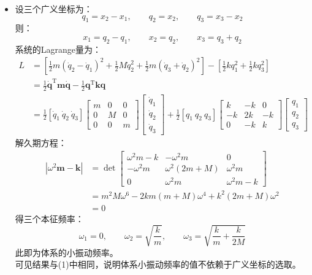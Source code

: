 \documentclass[a4paper,fontset=windows]{ctexart}
\begin{document}
\begin{itemize}
        \item[3.4.(2)]
        设三个广义坐标为：
        \[
        q_1 = x_2 - x_1,\qquad q_2 = x_2,\qquad q_3 = x_3 - x_2
        \]
        则：
        \[
        x_1 = q_2 - q_1,\qquad x_2 = q_2,\qquad x_3 = q_3 + q_2
        \]
        系统的Lagrange量为：
        \begin{align*}
            L
            &= \left[\frac{1}{2}m(\dot{q}_2-\dot{q}_1)^2 + \frac{1}{2}M\dot{q}_2^2 + \frac{1}{2}m(\dot{q}_3+\dot{q}_2)^2\right] - \left[\frac{1}{2}kq_1^2 + \frac{1}{2}kq_3^2\right] \\
            &= \frac{1}{2}\boldsymbol{\dot{q}}^{\mathrm{T}}\boldsymbol{m}\boldsymbol{\dot{q}} - \frac{1}{2}\boldsymbol{q}^{\mathrm{T}}\boldsymbol{k}\boldsymbol{q} \\
            &= \frac{1}{2}
            [\dot{q}_1\ \dot{q}_2\ \dot{q}_3]
            \begin{bmatrix}
                m & 0 & 0 \\
                0 & M & 0 \\
                0 & 0 & m
            \end{bmatrix}
            \begin{bmatrix}
                \dot{q}_1 \\
                \dot{q}_2 \\
                \dot{q}_3
            \end{bmatrix}
            + \frac{1}{2}
            [q_1\ q_2\ q_3]
            \begin{bmatrix}
                k & -k & 0 \\
                -k & 2k & -k \\
                0 & -k & k
            \end{bmatrix}
            \begin{bmatrix}
                q_1 \\
                q_2 \\
                q_3
            \end{bmatrix}
        \end{align*}
        解久期方程：
        \begin{align*}
            \left|\omega^2\boldsymbol{m}- \boldsymbol{k}\right|
            &= \det
            \begin{bmatrix}
                \omega^{2}m-k & -\omega^{2}m & 0 \\
                -\omega^{2}m & \omega^{2}(2m+M) & \omega^{2}m \\
                0 & \omega^{2}m & \omega^{2}m-k
            \end{bmatrix} \\
            &= m^2M\omega^6-2km(m+M)\omega^4+k^2(2m+M)\omega^2 \\
            &= 0
        \end{align*}
        得三个本征频率：
        \[
        \omega_1 = 0,\qquad \omega_2 = \sqrt{\frac{k}{m}},\qquad \omega_3 = \sqrt{\frac{k}{m}+\frac{k}{2M}}
        \]
        此即为体系的小振动频率。 \\
        可见结果与(1)中相同，说明体系小振动频率的值不依赖于广义坐标的选取。
        \bigskip


\end{itemize}
\end{document}
